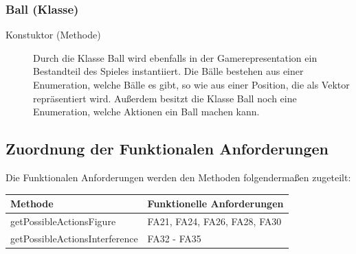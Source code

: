         \subsubsection{Ball (Klasse)}
        \begin{description}
        	\item[Konstuktor (Methode)]
        	Durch die Klasse Ball wird ebenfalls in der Gamerepresentation ein Bestandteil des Spieles instantiiert. Die Bälle bestehen aus einer Enumeration, welche Bälle es gibt, so wie aus einer Position, die als Vektor repräsentiert wird. Außerdem besitzt die Klasse Ball noch eine Enumeration, welche Aktionen ein Ball machen kann.
        \end{description}

\subsection{Zuordnung der Funktionalen Anforderungen}

Die Funktionalen Anforderungen werden den Methoden folgendermaßen zugeteilt:


\begin{table}[h]
	\centering
	\begin{tabular}{|l|l|}
    	\hline
    	\textbf{Methode} & \textbf{Funktionelle Anforderungen} \\ \hline
    	getPossibleActionsFigure		&	FA21, FA24, FA26, FA28, FA30\\ \hline
    	getPossibleActionsInterference	&	FA32 - FA35\\ \hline

	\end{tabular}
\end{table}
